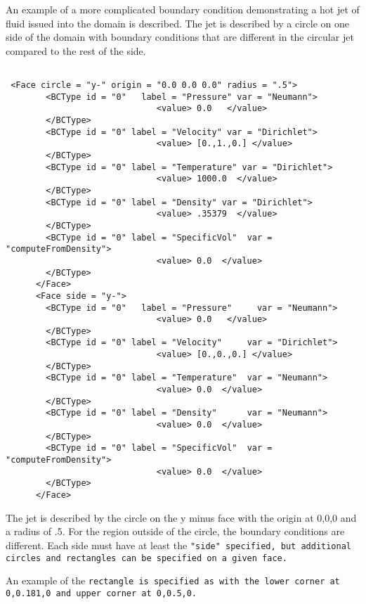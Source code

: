 An example of a more complicated boundary condition demonstrating a
hot jet of fluid issued into the domain is described.  The jet is
described by a circle on one side of the domain with boundary
conditions that are different in the circular jet compared to the rest
of the side.

\begin{Verbatim}[fontsize=\footnotesize]

 <Face circle = "y-" origin = "0.0 0.0 0.0" radius = ".5">
        <BCType id = "0"   label = "Pressure" var = "Neumann">
                              <value> 0.0   </value>
        </BCType>
        <BCType id = "0" label = "Velocity" var = "Dirichlet">
                              <value> [0.,1.,0.] </value>
        </BCType>
        <BCType id = "0" label = "Temperature" var = "Dirichlet">
                              <value> 1000.0  </value>
        </BCType>
        <BCType id = "0" label = "Density" var = "Dirichlet">
                              <value> .35379  </value>
        </BCType>
        <BCType id = "0" label = "SpecificVol"  var = "computeFromDensity">
                              <value> 0.0  </value>
        </BCType>
      </Face>
      <Face side = "y-">
        <BCType id = "0"   label = "Pressure"     var = "Neumann">
                              <value> 0.0   </value>
        </BCType>
        <BCType id = "0" label = "Velocity"     var = "Dirichlet">
                              <value> [0.,0.,0.] </value>
        </BCType>
        <BCType id = "0" label = "Temperature"  var = "Neumann">
                              <value> 0.0  </value>
        </BCType>
        <BCType id = "0" label = "Density"      var = "Neumann">
                              <value> 0.0  </value>
        </BCType>
        <BCType id = "0" label = "SpecificVol"  var = "computeFromDensity">
                              <value> 0.0  </value>
        </BCType>
      </Face>

\end{Verbatim}

The jet is described by the circle on the y minus face with the origin
at 0,0,0 and a radius of .5.  For the region outside of the circle,
the boundary conditions are different.  Each side must have at least
the \tt "side" \normalfont specified, but additional circles and
rectangles can be specified on a given face.

An example of the \tt rectangle \normalfont is specified as with the
lower corner at 0,0.181,0 and upper corner at 0,0.5,0.


